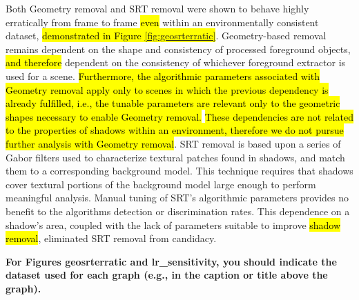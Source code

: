 \documentclass[12pt]{report}
\newcommand{\comment}[1]
           {\par {\bfseries \color{blue} #1 \par}}
\begin{document}
Both Geometry removal and SRT removal were shown to behave highly erratically from frame to frame \hl{even} within an environmentally consistent dataset, \hl{demonstrated in Figure \ref{fig:geosrterratic}}. Geometry-based removal remains dependent on the shape and consistency of processed foreground objects, \hl{and therefore} dependent on the consistency of whichever foreground extractor is used for a scene. \hl{Furthermore, the algorithmic parameters associated with Geometry removal apply only to scenes in which the previous dependency is already fulfilled, i.e., the tunable parameters are relevant only to the geometric shapes necessary to enable Geometry removal.} \hl{These dependencies are not related to the properties of shadows within an environment, therefore we do not pursue further analysis with Geometry removal}. SRT removal is based upon a series of Gabor filters used to characterize textural patches found in shadows, and match them to a corresponding background model. This technique requires that shadows cover textural portions of the background model large enough to perform meaningful analysis. Manual tuning of SRT's algorithmic parameters provides no benefit to the algorithms detection or discrimination rates. This dependence on a shadow's area, coupled with the lack of parameters suitable to improve \hl{shadow removal}, eliminated SRT removal from candidacy. 

\comment{For Figures geosrterratic and lr\_sensitivity, you should indicate the dataset used for each graph (e.g., in the caption or title above the graph).}
\end{document}
